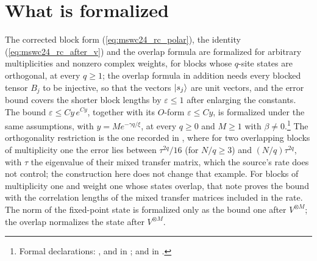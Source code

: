\documentclass{article}
\begin{document}
\section{What is formalized}
The corrected block form (\ref{eq:mswc24_rc_polar}), the identity
(\ref{eq:mswc24_rc_after_v}) and the overlap formula are formalized for arbitrary
multiplicities and nonzero complex weights, for blocks whose
$q$-site states are orthogonal, at every $q\geq1$; the overlap formula in addition
needs every blocked tensor $B_j$ to be injective, so that the vectors $|s_j\rangle$ are
unit vectors, and the error bound covers the shorter block lengths by
$\varepsilon\leq1$ after enlarging the constants. The bound
$\varepsilon\leq Cy\,e^{Cy}$, together with its $O$-form $\varepsilon\leq Cy$, is
formalized under the same assumptions, with $y=Me^{-\gamma q/\xi}$, at every $q\geq0$ and $M\geq1$ with
$\beta\neq0$.\footnote{Formal declarations:
    ,
     and
     in
    ;
     and
     in
    .} The orthogonality
restriction is the one recorded in \cite{gap:mswc24_block_form_mixed_overlap},
where for two overlapping blocks of multiplicity one the error lies between
$\tau^{2q}/16$ (for $N/q\geq3$) and $(N/q)\tau^{2q}$, with $\tau$ the eigenvalue of their mixed transfer
matrix, which the source's rate does not control; the construction here does not
change that example. For blocks of multiplicity one and weight one whose states
overlap, that note proves the bound with the correlation lengths of the mixed transfer
matrices included in the rate. The norm of the fixed-point state is formalized only as the
bound one after $V^{\otimes M}$; the overlap normalizes the state after $V^{\otimes M}$.
\end{document}
